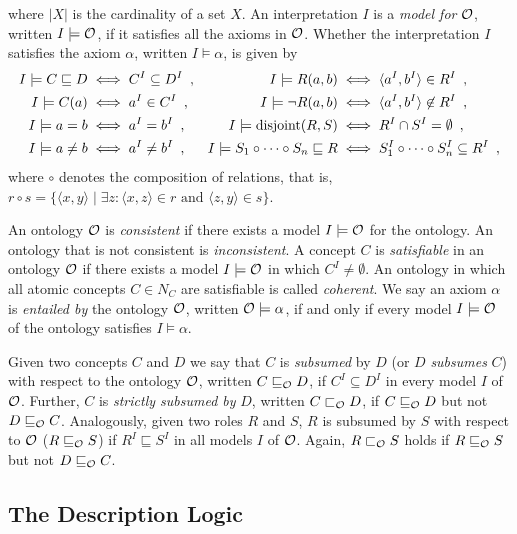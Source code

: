 where $|X|$ is the cardinality of a set $X$.
An interpretation $I$ is a \emph{model for} $\mathcal{O}$, written $I \models \mathcal{O}$, if it satisfies all the axioms in $\mathcal{O}$. Whether the interpretation $I$ satisfies the axiom $\alpha$, written $I \models \alpha$, is given by
\begin{align*}
  I \models C \sqsubseteq D &\iff C^I \subseteq D^I \enspace, &
  I \models R(a, b) &\iff \langle a^I, b^I \rangle \in R^I \enspace,\\
  I \models C(a) &\iff a^I \in C^I \enspace, &
  I \models \lnot R(a, b) &\iff \langle a^I, b^I \rangle \not\in R^I \enspace, \\
  I \models a = b &\iff a^I = b^I \enspace, &
  I \models \operatorname{disjoint}(R, S) &\iff R^I \cap S^I = \emptyset \enspace, \\
  I \models a \not= b &\iff a^I \not= b^I \enspace, &
  I \models S_1 \circ \cdots \circ S_n \sqsubseteq R &\iff S_1^I \circ \cdots \circ S_n^I \subseteq R^I \enspace,
\end{align*}
where $\circ$ denotes the composition of relations, that is, $r \circ s = \{ \langle x, y \rangle \mid \exists z : \langle x, z \rangle \in r \text{ and } \langle z, y \rangle \in s \}$.

An ontology $\mathcal{O}$ is \emph{consistent} if there exists a model $I \models \mathcal{O}$ for the ontology. An ontology that is not consistent is \emph{inconsistent}. A concept $C$ is \emph{satisfiable} in an ontology $\mathcal{O}$ if there exists a model $I \models \mathcal{O}$ in which $C^I \not= \emptyset$. An ontology in which all atomic concepts $C \in N_C$ are satisfiable is called \emph{coherent}. We say an axiom $\alpha$ is \emph{entailed by} the ontology $\mathcal{O}$, written $\mathcal{O} \models \alpha$, if and only if every model $I \models \mathcal{O}$ of the ontology satisfies $I \models \alpha$. 

Given two concepts $C$ and $D$ we say that $C$ is \emph{subsumed} by $D$ (or $D$ \emph{subsumes} $C$) with respect to the ontology $\mathcal{O}$, written $C \sqsubseteq_\mathcal{O} D$, if $C^I \subseteq D^I$ in every model $I$ of $\mathcal{O}$. Further, $C$ is \emph{strictly subsumed by} $D$, written $C \sqsubset_\mathcal{O} D$, if $C \sqsubseteq_\mathcal{O} D$ but not $D \sqsubseteq_\mathcal{O} C$. Analogously, given two roles $R$ and $S$, $R$ is subsumed by $S$ with respect to $\mathcal{O}$ ($R \sqsubseteq_\mathcal{O} S$) if $R^I \sqsubseteq S^I$ in all models $I$ of $\mathcal{O}$. Again, $R \sqsubset_\mathcal{O} S$ holds if $R \sqsubseteq_\mathcal{O} S$ but not $D \sqsubseteq_\mathcal{O} C$.

\subsection{The \ALC Description Logic}

